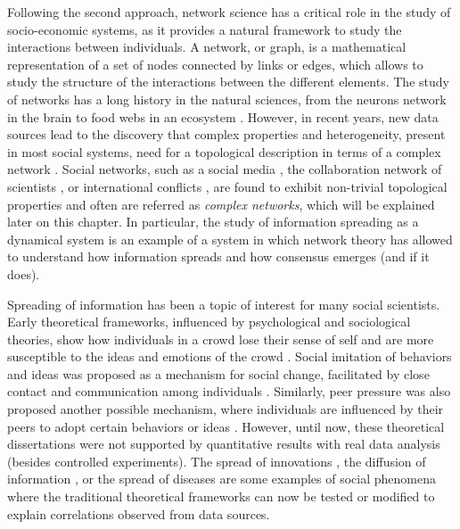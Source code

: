 Following the second approach, network science has a critical role in the study of socio-economic systems, as it provides a natural framework to study the interactions between individuals. A network, or graph, is a mathematical representation of a set of nodes connected by links or edges, which allows to study the structure of the interactions between the different elements. The study of networks has a long history in the natural sciences, from the neurons network in the brain \cite{sporns-2004} to food webs in an ecosystem \cite{ings-2008, elith-2009, bastolla-2009}. However, in recent years, new data sources lead to the discovery that complex properties and heterogeneity, present in most social systems, need for a topological description in terms of a complex network \cite{newman-book, dorogovtsev2002evolution, boccaletti2006complex}. Social networks, such as a social media \cite{dunbar-2015}, the collaboration network of scientists \cite{newman-coll-2001,radicchi-2008}, or international conflicts \cite{hafnerburton-2009, diaz2023network}, are found to exhibit non-trivial topological properties and often are referred as \textit{complex networks}, which will be explained later on this chapter. In particular, the study of information spreading as a dynamical system is an example of a system in which network theory has allowed to understand how information spreads and how consensus emerges (and if it does).

Spreading of information has been a topic of interest for many social scientists. Early theoretical frameworks, influenced by psychological and sociological theories, show how individuals in a crowd lose their sense of self and are more susceptible to the ideas and emotions of the crowd \cite{le2023crowd}. Social imitation of behaviors and ideas was proposed as a mechanism for social change, facilitated by close contact and communication among individuals \cite{kanter-1971}. Similarly, peer pressure was also proposed another possible mechanism, where individuals are influenced by their peers to adopt certain behaviors or ideas \cite{granovetter-1978, brown-1986}. However, until now, these theoretical dissertations were not supported by quantitative results with real data analysis (besides controlled experiments). The spread of innovations \cite{rogers2014}, the diffusion of information \cite{valente-1996}, or the spread of diseases \cite{anderson1991infectious} are some examples of social phenomena where the traditional theoretical frameworks can now be tested or modified to explain correlations observed from data sources.

